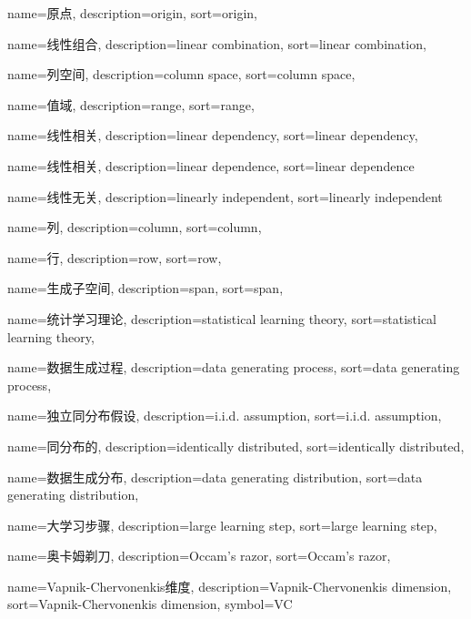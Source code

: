 {
  name=原点,
  description={origin},
  sort={origin},
}

{
  name=线性组合,
  description={linear combination},
  sort={linear combination},
}

{
  name=列空间,
  description={column space},
  sort={column space},
}

{
  name=值域,
  description={range},
  sort={range},
}

{
  name=线性相关,
  description={linear dependency},
  sort={linear dependency},
}

{
  name=线性相关,
  description={linear dependence},
  sort={linear dependence}
}

{
  name=线性无关,
  description={linearly independent},
  sort={linearly independent}
}

{
  name=列,
  description={column},
  sort={column},
}

{
  name=行,
  description={row},
  sort={row},
}

{
  name=生成子空间,
  description={span},
  sort={span},
}

{
  name=统计学习理论,
  description={statistical learning theory},
  sort={statistical learning theory},
}

{
  name=数据生成过程,
  description={data generating process},
  sort={data generating process},
}

{
  name=独立同分布假设,
  description={i.i.d. assumption},
  sort={i.i.d. assumption},
}

{
  name=同分布的,
  description={identically distributed},
  sort={identically distributed},
}

{
  name=数据生成分布,
  description={data generating distribution},
  sort={data generating distribution},
}

{
  name=大学习步骤,
  description={large learning step},
  sort={large learning step},
}

{
  name=奥卡姆剃刀,
  description={Occam's razor},
  sort={Occam's razor},
}

{
  name=Vapnik-Chervonenkis维度,
  description={Vapnik-Chervonenkis dimension},
  sort={Vapnik-Chervonenkis dimension},
  symbol={VC}
}

